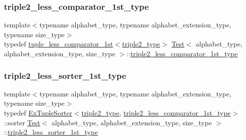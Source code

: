 \mbox{\label{class_test_a8eb2bb639be9c46697c52f77d79703a8}} 
\subsubsection{\texorpdfstring{triple2\+\_\+less\+\_\+comparator\+\_\+1st\+\_\+type}{triple2\_less\_comparator\_1st\_type}}
{\footnotesize\ttfamily template$<$typename alphabet\+\_\+type, typename alphabet\+\_\+extension\+\_\+type, typename size\+\_\+type$>$ \\
typedef \hyperlink{structtuple__less__comparator__1st}{tuple\+\_\+less\+\_\+comparator\+\_\+1st}$<$\hyperlink{class_test_ae1d42342f4ec472a724f55af01c3c5ab}{triple2\+\_\+type}$>$ \hyperlink{class_test}{Test}$<$ alphabet\+\_\+type, alphabet\+\_\+extension\+\_\+type, size\+\_\+type $>$\+::\hyperlink{class_test_a8eb2bb639be9c46697c52f77d79703a8}{triple2\+\_\+less\+\_\+comparator\+\_\+1st\+\_\+type}\hspace{0.3cm}{\ttfamily [private]}}

\mbox{\label{class_test_a1e7fba953871f5eee60eabf8b0e287b7}} 
\subsubsection{\texorpdfstring{triple2\+\_\+less\+\_\+sorter\+\_\+1st\+\_\+type}{triple2\_less\_sorter\_1st\_type}}
{\footnotesize\ttfamily template$<$typename alphabet\+\_\+type, typename alphabet\+\_\+extension\+\_\+type, typename size\+\_\+type$>$ \\
typedef \hyperlink{struct_ex_tuple_sorter}{Ex\+Tuple\+Sorter}$<$\hyperlink{class_test_ae1d42342f4ec472a724f55af01c3c5ab}{triple2\+\_\+type}, \hyperlink{class_test_a8eb2bb639be9c46697c52f77d79703a8}{triple2\+\_\+less\+\_\+comparator\+\_\+1st\+\_\+type}$>$\+::sorter \hyperlink{class_test}{Test}$<$ alphabet\+\_\+type, alphabet\+\_\+extension\+\_\+type, size\+\_\+type $>$\+::\hyperlink{class_test_a1e7fba953871f5eee60eabf8b0e287b7}{triple2\+\_\+less\+\_\+sorter\+\_\+1st\+\_\+type}\hspace{0.3cm}{\ttfamily [private]}}

